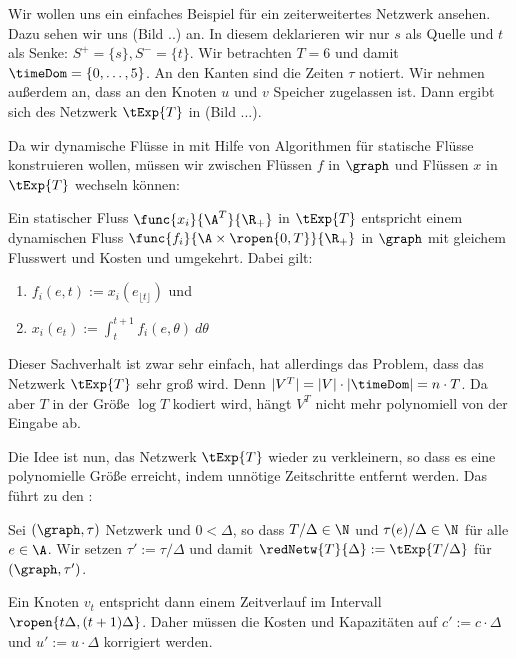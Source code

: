 \begin{example}
    Wir wollen uns ein einfaches Beispiel für ein zeiterweitertes Netzwerk 
    ansehen. Dazu sehen wir uns (Bild ..) an. In diesem deklarieren wir
    nur $s$ als Quelle und $t$ als Senke: $S^+ = \{s\}, S^- = \{t\}$.
    Wir betrachten $T = 6$ und damit $\timeDom = \{0, \ldots, 5\}$. An den
    Kanten sind die Zeiten $\tau$ notiert. Wir nehmen außerdem an, dass
    an den Knoten $u$ und $v$ Speicher zugelassen ist. Dann ergibt sich
    des Netzwerk $\tExp{T}$ in (Bild ...).
\end{example}

Da wir dynamische Flüsse in mit Hilfe von Algorithmen für statische Flüsse
konstruieren wollen, müssen wir zwischen Flüssen $f$ in $\graph$ und
Flüssen $x$ in $\tExp{T}$ wechseln können:

\begin{lemma}\label{lem:static_dyn_conv}
    Ein statischer Fluss $\func{x_i}{\A^T}{\R_+}$ in $\tExp{T}$ entspricht einem
    dynamischen Fluss $\func{f_i}{\A \times \ropen{0,T}}{\R_+}$ in $\graph$
    mit gleichem Flusswert und Kosten und umgekehrt. Dabei gilt:
    \begin{enumerate}
        \item $f_i(e,t) := x_i(e_{\lfloor t \rfloor})$ und
        \item $x_i(e_t) := \int_t^{t+1} f_i(e, \theta) \: d\theta$
    \end{enumerate}
\end{lemma}

Dieser Sachverhalt ist zwar sehr einfach, hat allerdings das Problem, dass das
Netzwerk $\tExp{T}$ sehr groß wird. Denn $|V^T| = |V| \cdot |\timeDom| = n \cdot T$.
Da aber $T$ in der Größe $\log T$ kodiert wird, hängt $V^T$ nicht mehr polynomiell
von der Eingabe ab.

Die Idee ist nun, das Netzwerk $\tExp{T}$ wieder zu verkleinern, so dass es
eine polynomielle Größe erreicht, indem unnötige Zeitschritte entfernt werden.
Das führt zu den :

\begin{definition}
    Sei $(\graph, \tau)$ Netzwerk und $0 < \Delta$, so dass $T/\Delta \in \N$
    und $\tau(e)/\Delta \in \N$ für alle $e \in \A$. Wir setzen
    $\tau' := \tau/\Delta$ und damit
    $\redNetw{T}{\Delta} := \tExp{T/\Delta}$ für $(\graph, \tau')$.
    
    Ein Knoten $v_t$ entspricht dann einem Zeitverlauf im Intervall
    $\ropen{t \Delta, (t+1) \Delta}$. Daher müssen die Kosten und Kapazitäten
    auf $c' := c \cdot \Delta$ und $u' := u \cdot \Delta$ korrigiert werden.
\end{definition}

